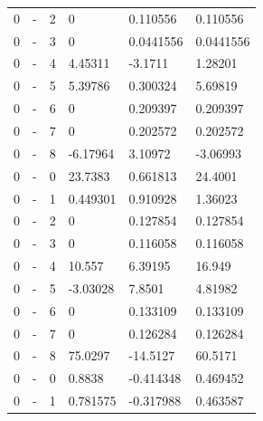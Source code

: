 \begin{longtable}
{}0 & \allowbreak{}-\allowbreak{} & 2 & 0 & 0.110556 & 0.110556 \\
{}0 & \allowbreak{}-\allowbreak{} & 3 & 0 & 0.0441556 & 0.0441556 \\
{}0 & \allowbreak{}-\allowbreak{} & 4 & 4.45311 & -3.1711 & 1.28201 \\
{}0 & \allowbreak{}-\allowbreak{} & 5 & 5.39786 & 0.300324 & 5.69819 \\
{}0 & \allowbreak{}-\allowbreak{} & 6 & 0 & 0.209397 & 0.209397 \\
{}0 & \allowbreak{}-\allowbreak{} & 7 & 0 & 0.202572 & 0.202572 \\
{}0 & \allowbreak{}-\allowbreak{} & 8 & -6.17964 & 3.10972 & -3.06993 \\
{}0 & \allowbreak{}-\allowbreak{} & 0 & 23.7383 & 0.661813 & 24.4001 \\
{}0 & \allowbreak{}-\allowbreak{} & 1 & 0.449301 & 0.910928 & 1.36023 \\
{}0 & \allowbreak{}-\allowbreak{} & 2 & 0 & 0.127854 & 0.127854 \\
{}0 & \allowbreak{}-\allowbreak{} & 3 & 0 & 0.116058 & 0.116058 \\
{}0 & \allowbreak{}-\allowbreak{} & 4 & 10.557 & 6.39195 & 16.949 \\
{}0 & \allowbreak{}-\allowbreak{} & 5 & -3.03028 & 7.8501 & 4.81982 \\
{}0 & \allowbreak{}-\allowbreak{} & 6 & 0 & 0.133109 & 0.133109 \\
{}0 & \allowbreak{}-\allowbreak{} & 7 & 0 & 0.126284 & 0.126284 \\
{}0 & \allowbreak{}-\allowbreak{} & 8 & 75.0297 & -14.5127 & 60.5171 \\
{}0 & \allowbreak{}-\allowbreak{} & 0 & 0.8838 & -0.414348 & 0.469452 \\
{}0 & \allowbreak{}-\allowbreak{} & 1 & 0.781575 & -0.317988 & 0.463587 \\

\end{longtable}
